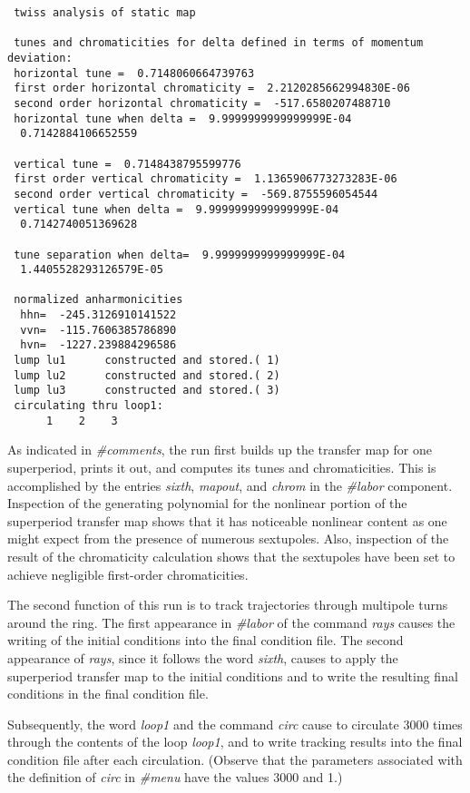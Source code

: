 {\begin{verbatim}
 twiss analysis of static map

 tunes and chromaticities for delta defined in terms of momentum deviation:
 horizontal tune =  0.7148060664739763
 first order horizontal chromaticity =  2.2120285662994830E-06
 second order horizontal chromaticity =  -517.6580207488710
 horizontal tune when delta =  9.9999999999999999E-04
  0.7142884106652559

 vertical tune =  0.7148438795599776
 first order vertical chromaticity =  1.1365906773273283E-06
 second order vertical chromaticity =  -569.8755596054544
 vertical tune when delta =  9.9999999999999999E-04
  0.7142740051369628

 tune separation when delta=  9.9999999999999999E-04
  1.4405528293126579E-05

 normalized anharmonicities
  hhn=  -245.3126910141522
  vvn=  -115.7606385786890
  hvn=  -1227.239884296586
 lump lu1      constructed and stored.( 1)
 lump lu2      constructed and stored.( 2)
 lump lu3      constructed and stored.( 3)
 circulating thru loop1:
      1    2    3
\end{verbatim}}

     As indicated in {\em \#comments}, the \Mary run first builds up the
transfer map for one superperiod, prints it out, and computes its tunes and
chromaticities.  This is accomplished by the entries {\em sixth}, {\em mapout}, and
{\em chrom } in the {\em \#labor} component.  Inspection of the generating polynomial for
the nonlinear portion of the superperiod transfer map shows that it has
noticeable nonlinear content as one might expect from the presence of
numerous sextupoles.  Also, inspection of the result of the chromaticity
calculation shows that the sextupoles have been set to achieve negligible
first-order chromaticities.

     The second function of this \Mary run is to track trajectories
through multipole turns around the ring.  The first appearance in {\em \#labor} of
the command {\em rays } causes the writing of the initial conditions into the
final condition file.  The second appearance of {\em rays}, since it follows the
word {\em sixth}, causes \Mary to apply the superperiod transfer map to the
initial conditions and to write the resulting final conditions in the final
condition file.

     Subsequently, the word {\em loop1 } and the command {\em circ } cause \Mary to
circulate 3000 times through the contents of the loop {\em loop1}, and to write
tracking results into the final condition file after each circulation.
(Observe that the parameters associated with the definition of {\em circ } in
{\em \#menu} have the values 3000 and 1.)

